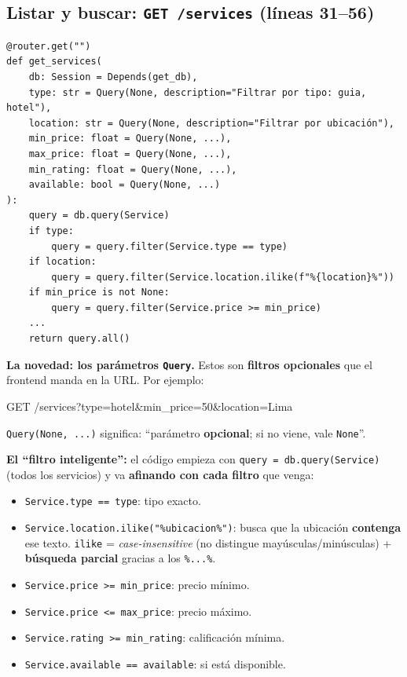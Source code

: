 \documentclass[11pt,a4paper]{article}
\begin{document}
\subsection{Listar y buscar: \texttt{GET /services} (líneas 31--56)}

\begin{lstlisting}
@router.get("")
def get_services(
    db: Session = Depends(get_db),
    type: str = Query(None, description="Filtrar por tipo: guia, hotel"),
    location: str = Query(None, description="Filtrar por ubicación"),
    min_price: float = Query(None, ...),
    max_price: float = Query(None, ...),
    min_rating: float = Query(None, ...),
    available: bool = Query(None, ...)
):
    query = db.query(Service)
    if type:
        query = query.filter(Service.type == type)
    if location:
        query = query.filter(Service.location.ilike(f"%{location}%"))
    if min_price is not None:
        query = query.filter(Service.price >= min_price)
    ...
    return query.all()
\end{lstlisting}

\textbf{La novedad: los parámetros \texttt{Query}.} Estos son \textbf{filtros opcionales} que el
frontend manda en la URL. Por ejemplo:

\begin{center}
\colorbox{fondocodigo}{\parbox{0.92\textwidth}{\ttfamily\small
GET /services?type=hotel\&min\_price=50\&location=Lima
}}
\end{center}

\texttt{Query(None, ...)} significa: ``parámetro \textbf{opcional}; si no viene, vale
\texttt{None}''.

\textbf{El ``filtro inteligente'':} el código empieza con \texttt{query = db.query(Service)}
(todos los servicios) y va \textbf{afinando con cada filtro} que venga:

\begin{itemize}
    \item \texttt{Service.type == type}: tipo exacto.
    \item \texttt{Service.location.ilike("\%ubicacion\%")}: busca que la ubicación
    \textbf{contenga} ese texto. \texttt{ilike} = \emph{case-insensitive} (no distingue
    mayúsculas/minúsculas) + \textbf{búsqueda parcial} gracias a los \texttt{\%...\%}.
    \item \texttt{Service.price >= min\_price}: precio mínimo.
    \item \texttt{Service.price <= max\_price}: precio máximo.
    \item \texttt{Service.rating >= min\_rating}: calificación mínima.
    \item \texttt{Service.available == available}: si está disponible.
\end{itemize}
\end{document}

